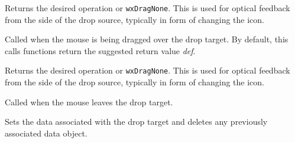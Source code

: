 




Returns the desired operation or {\tt wxDragNone}. This is used for optical feedback
from the side of the drop source, typically in form of changing the icon.

\label{wxdroptargetondragover}


Called when the mouse is being dragged over the drop target. By default, 
this calls functions return the suggested return value {\it def}.






Returns the desired operation or {\tt wxDragNone}. This is used for optical feedback
from the side of the drop source, typically in form of changing the icon.

\label{wxdroptargetonleave}


Called when the mouse leaves the drop target.

\label{wxdroptargetsetdataobject}


Sets the data  associated with the 
drop target and deletes any previously associated data object.

